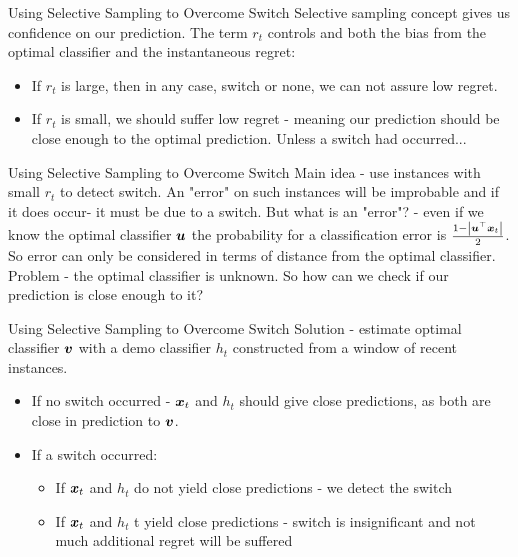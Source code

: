 \documentclass{beamer}
\begin{document}
\begin{frame}{Using Selective Sampling to Overcome Switch}
Selective sampling concept gives us confidence on our prediction.\newline
\newline
The term $r_t$ controls and both the bias from the optimal classifier and the instantaneous regret:
\begin{itemize}
\item If $r_t$ is large, then in any case, switch or none, we can not assure low regret.
\item If $r_t$ is small, we should suffer low regret - meaning our prediction should be close enough to the optimal prediction. Unless a switch had occurred...
\end{itemize}
\end{frame}

\begin{frame}{Using Selective Sampling to Overcome Switch}
Main idea - use instances with small $r_t$ to detect switch. An "error" on such instances will be improbable and if it does occur- it must be due to a switch.\newline
\newline
But what is an "error"? - even if we know the optimal classifier ${\boldsymbol{u}}$ the probability for a classification error is $\frac{1-\left|{{\boldsymbol{u}}}^{\top}{\boldsymbol{x}}_{t}\right|}{2}$. So error can only be considered in terms of distance from the optimal classifier.
\newline
\newline
Problem - the optimal classifier is unknown. So how can we check if our prediction is close enough to it?

\end{frame}

\begin{frame}{Using Selective Sampling to Overcome Switch}
Solution - estimate optimal classifier ${\boldsymbol{v}}$ with a demo classifier $h_t$ constructed from a window of recent instances.\newline
\begin{itemize}
\item If no switch occurred - ${\boldsymbol{x}}_{t}$ and $h_t$ should give close predictions, as both are close in prediction to ${\boldsymbol{v}}$.
\newline
\item If a switch occurred:
\begin{itemize}
\item If ${\boldsymbol{x}}_{t}$ and $h_t$ do not yield close predictions - we detect the switch
\item If ${\boldsymbol{x}}_{t}$ and $h_t$ t yield close predictions -  switch is insignificant and not much additional regret will be suffered
\end{itemize}
\end{itemize}
\end{frame}
\end{document}
